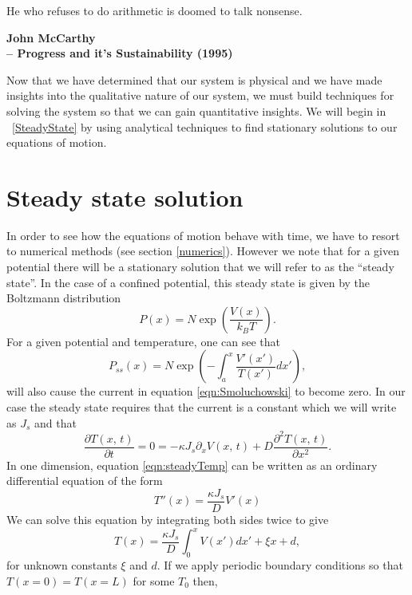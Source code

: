 \epigraph{He who refuses to do arithmetic is doomed to talk nonsense.}{\textbf{John McCarthy \\ -- Progress and it's Sustainability (1995)}}
Now that we have determined that our system is physical and we have made insights into the qualitative nature of our system, we must build techniques for solving the system so that we can gain quantitative insights. We will begin in ~\autoref{SteadyState} by using analytical techniques to find stationary solutions to our equations of motion.
\section{Steady state solution} \label{SteadyState}
In order to see how the equations of motion behave with time, we have to resort to numerical methods (see section \ref{numerics}). However we note that for a given potential there will be a stationary solution that we will refer to as the ``steady state''. In the case of a confined potential, this steady state is given by the Boltzmann distribution
\begin{equation}
P(x) = N \exp(\frac{V(x)}{k_B T}).
\end{equation}
For a given potential and temperature, one can see that
\begin{equation}
P_{ss}(x) = N \exp{\left(-\int_a^x \frac{V'(x')}{T(x')} dx' \right)},
\end{equation}
will also cause the current in equation \ref{eqn:Smoluchowski} to become zero. In our case the steady state requires that the current is a constant which we will write as $J_s$ and that
\begin{equation}
\frac{\partial T(x, \, t)}{\partial t} = 0 = -\kappa J_s \partial_x V(x, \, t) + D \frac{\partial^2 T(x, \, t)}{\partial x^2}. \label{eqn:steadyTemp}
\end{equation}
In one dimension, equation \ref{eqn:steadyTemp} can be written as an ordinary differential equation of the form
\begin{equation}
T''(x) = \frac{\kappa J_s}{D} V'(x)
\end{equation}
We can solve this equation by integrating both sides twice to give
\begin{equation}
T(x) = \frac{\kappa J_s}{D} \int_0^x V(x') dx' + \xi x + d, \label{eqn:steadyTemperature}
\end{equation}
for unknown constants $\xi$ and $d$. If we apply periodic boundary conditions so that $T(x = 0) = T(x = L)$ for some $T_0$ then,
